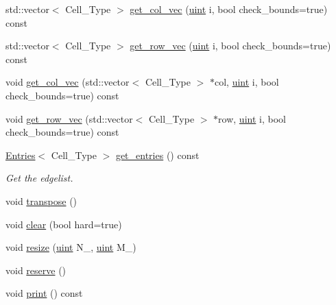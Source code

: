 \begin{DoxyCompactItemize}
\item 
std\+::vector$<$ Cell\+\_\+\+Type $>$ \hyperlink{class_b_array_aa2d5a133fc4adf3417f1fdc2ef5aae26}{get\+\_\+col\+\_\+vec} (\hyperlink{typedefs_8hpp_a91ad9478d81a7aaf2593e8d9c3d06a14}{uint} i, bool check\+\_\+bounds=true) const
\item 
std\+::vector$<$ Cell\+\_\+\+Type $>$ \hyperlink{class_b_array_a2be45b966d99e2bdd3f9994ed70ff145}{get\+\_\+row\+\_\+vec} (\hyperlink{typedefs_8hpp_a91ad9478d81a7aaf2593e8d9c3d06a14}{uint} i, bool check\+\_\+bounds=true) const
\item 
void \hyperlink{class_b_array_a655e21d184c3cb0ce758168319dc7021}{get\+\_\+col\+\_\+vec} (std\+::vector$<$ Cell\+\_\+\+Type $>$ $\ast$col, \hyperlink{typedefs_8hpp_a91ad9478d81a7aaf2593e8d9c3d06a14}{uint} i, bool check\+\_\+bounds=true) const
\item 
void \hyperlink{class_b_array_a7b098128c6debca4409d15d1906bd2be}{get\+\_\+row\+\_\+vec} (std\+::vector$<$ Cell\+\_\+\+Type $>$ $\ast$row, \hyperlink{typedefs_8hpp_a91ad9478d81a7aaf2593e8d9c3d06a14}{uint} i, bool check\+\_\+bounds=true) const
\item 
\hyperlink{class_entries}{Entries}$<$ Cell\+\_\+\+Type $>$ \hyperlink{class_b_array_aee224325422d214624771a5b4d91b55e}{get\+\_\+entries} () const
\begin{DoxyCompactList}\small\item\em Get the edgelist. \end{DoxyCompactList}\item 
void \hyperlink{class_b_array_a0284f7f2148b7c1b474ebe01f6548b98}{transpose} ()
\item 
void \hyperlink{class_b_array_a6dd5ebff333b376c6fb569e48290935f}{clear} (bool hard=true)
\item 
void \hyperlink{class_b_array_aefe411fe1890273518bfbc3f8ca616ce}{resize} (\hyperlink{typedefs_8hpp_a91ad9478d81a7aaf2593e8d9c3d06a14}{uint} N\+\_\+, \hyperlink{typedefs_8hpp_a91ad9478d81a7aaf2593e8d9c3d06a14}{uint} M\+\_\+)
\item 
void \hyperlink{class_b_array_a5eacd388e3d0f638f2c35b6e0f0c490c}{reserve} ()
\item 
void \hyperlink{class_b_array_a9d150c44b23cf1e4af45f540508db1de}{print} () const
\end{DoxyCompactItemize}
